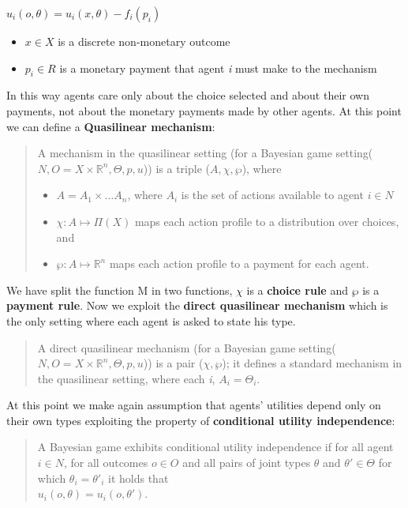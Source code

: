 \documentclass{article}
\begin{document}
{\begin{center}
    $u_i(o,\theta) = u_i(x,\theta) - f_i(p_i)$
    \begin{itemize}
        \item $x \in X$ is a discrete non-monetary outcome
        \item $p_i \in R$ is a monetary payment that agent \textit{i} must make to the mechanism
    \end{itemize}
\end{center}
In this way agents care only about the choice selected and about their own payments, not about the monetary payments made by other agents. At this point we can define a \textbf{Quasilinear mechanism}:
\begin{quote}
    A mechanism in the quasilinear setting (for a Bayesian game setting($N,O = X \times \mathbb{R}^n,\Theta,p,u$)) is a triple ($A,\chi,\wp$), where
    \begin{itemize}
        \item $A = A_1 \times \dots A_n$, where $A_i$ is the set of actions available to agent $i \in N$
        \item $\chi : A \mapsto \Pi(X)$ maps each action profile to a distribution over choices, and
        \item $\wp : A \mapsto \mathbb{R}^n$ maps each action profile to a payment for each agent.
    \end{itemize}
\end{quote}
We have split the function M in two functions, $\chi$ is a \textbf{choice rule} and $\wp$ is a \textbf{payment rule}. Now we exploit the \textbf{direct quasilinear mechanism} which is the only setting where each agent is asked to state his type.
\begin{quote}
    A direct quasilinear mechanism (for a Bayesian game setting($N,O = X \times \mathbb{R}^n,\Theta,p,u$)) is a pair ($\chi,\wp$); it defines a standard mechanism in the quasilinear setting, where each \textit{i}, $A_i = \Theta_i$.
\end{quote}
At this point we make again assumption that agents' utilities depend only on their own types exploiting the property of \textbf{conditional utility independence}:
\begin{quote}
    A Bayesian game exhibits conditional utility independence if for all agent $i \in N$, for all outcomes $o \in O$ and all pairs of joint types $\theta$ and $\theta' \in \Theta$ for which $\theta_i = \theta'_i$ it holds that \\ $u_i(o,\theta) = u_i(o,\theta')$. 
\end{quote}
}
\end{document}
